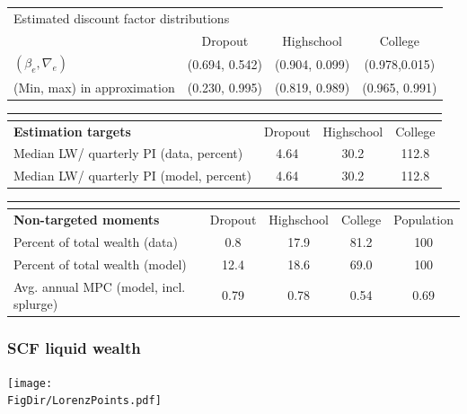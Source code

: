 \documentclass[pdflatex,aspectratio=169]{beamer}
\begin{document}
\begin{frame}
\begin{tabular}{lccc}
	\multicolumn{4}{l}{Estimated discount factor distributions} \\ 
	& Dropout & Highschool & College \\ \midrule
	$(\beta_e, \nabla_e)$ & (0.694, 0.542) & (0.904, 0.099) & (0.978,0.015) \\
	(Min, max) in approximation & (0.230, 0.995) & (0.819, 0.989) & (0.965, 0.991) \\
	\midrule 
\end{tabular} 
\begin{tabular}{lccc}
	\multicolumn{4}{l}{ } \\ \midrule
	\textbf{Estimation targets} & Dropout & Highschool & College \\ \midrule
	Median LW/ quarterly PI (data, percent) & 4.64 & 30.2 & 112.8 \\ 
	Median LW/ quarterly PI (model, percent) & 4.64 & 30.2 & 112.8 %
	\\ \midrule 
\end{tabular} 
\begin{tabular}{lcccc}
	\multicolumn{5}{l}{ } \\ \midrule
	\textbf{Non-targeted moments} & Dropout & Highschool & College & Population \\ \midrule
	Percent of total wealth (data) & 0.8 & 17.9 & 81.2 & 100 \\
	Percent of total wealth (model) & 12.4 & 18.6 & 69.0 & 100 \\
	Avg. annual MPC (model, incl. splurge) & 0.79 & 0.78 & 0.54 & 0.69
	\\ \bottomrule 
\end{tabular}
\end{frame}




\begin{frame}
\frametitle{SCF liquid wealth}
\centering
\texttt{[image: \\FigDir/LorenzPoints.pdf]}
\end{frame}
\end{document}
